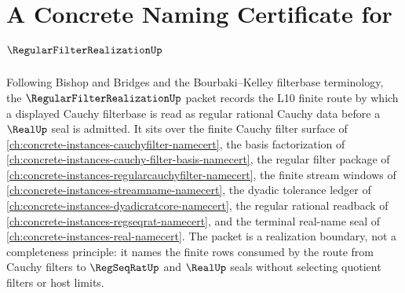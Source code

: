 \chapter{A Concrete Naming Certificate for $\RegularFilterRealizationUp$}
\label{ch:concrete-instances-regular-filter-realization-namecert}

Following Bishop and Bridges and the Bourbaki--Kelley filterbase terminology, the $\RegularFilterRealizationUp$ packet records the L10 finite route by which a displayed Cauchy filterbase is read as regular rational Cauchy data before a $\RealUp$ seal is admitted. It sits over the finite Cauchy filter surface of \autoref{ch:concrete-instances-cauchyfilter-namecert}, the basis factorization of \autoref{ch:concrete-instances-cauchy-filter-basis-namecert}, the regular filter package of \autoref{ch:concrete-instances-regularcauchyfilter-namecert}, the finite stream windows of \autoref{ch:concrete-instances-streamname-namecert}, the dyadic tolerance ledger of \autoref{ch:concrete-instances-dyadicratcore-namecert}, the regular rational readback of \autoref{ch:concrete-instances-regseqrat-namecert}, and the terminal real-name seal of \autoref{ch:concrete-instances-real-namecert}. The packet is a realization boundary, not a completeness principle: it names the finite rows consumed by the route from Cauchy filters to $\RegSeqRatUp$ and $\RealUp$ seals without selecting quotient filters or host limits.

